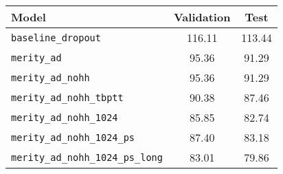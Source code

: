 \begin{tabular}{lcc}
    \toprule
    \textbf{Model}& \textbf{Validation} & \textbf{Test} \\
    \midrule
    \texttt{baseline\_dropout} & 116.11 & 113.44 \\
    \texttt{merity\_ad} & 95.36 & 	91.29 \\
    \texttt{merity\_ad\_nohh} & 95.36 & 91.29 \\
    \texttt{merity\_ad\_nohh\_tbptt} & 90.38 &	87.46 \\
    \texttt{merity\_ad\_nohh\_1024} & 85.85 &	82.74 \\
    \texttt{merity\_ad\_nohh\_1024\_ps} & 87.40 &	83.18 \\
    \texttt{merity\_ad\_nohh\_1024\_ps\_long} & 83.01 &	79.86 \\
    \bottomrule
\end{tabular}